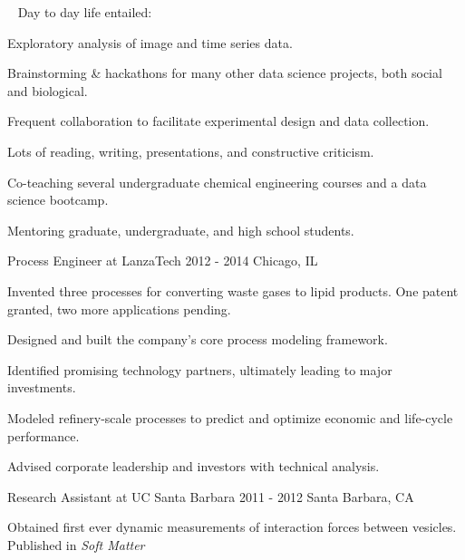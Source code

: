 \begin{cventries}
{%
    \ \newline 
    Day to day life entailed:
    \vspace{4.0mm}
    \begin{cvitems}
		 \item {Exploratory analysis of image and time series data.}
		 \item {Brainstorming \& hackathons for many other data science projects, both social and biological.}
		 \item {Frequent collaboration to facilitate experimental design and data collection.}
		 \item {Lots of reading, writing, presentations, and constructive criticism.}          
         \item {Co-teaching several undergraduate chemical engineering courses and a data science bootcamp.}
         \item {Mentoring graduate, undergraduate, and high school students.}         
      \end{cvitems}
     }
      
  \cventrynew
    {Process Engineer at LanzaTech} 
    {2012 - 2014} 
    {Chicago, IL} 
    {
      \begin{cvitems} %
        \item {Invented three processes for converting waste gases to lipid products. One patent granted, two more applications pending.}
		\item {Designed and built the company's core process modeling framework.}        
		\item {Identified promising technology partners, ultimately leading to major investments.}
        \item {Modeled refinery-scale processes to predict and optimize economic and life-cycle performance.}        
        \item {Advised corporate leadership and investors with technical analysis.}
      \end{cvitems}
    }
    
  \cventryshort
    {Research Assistant at UC Santa Barbara}
    {2011 - 2012}
    {Santa Barbara, CA}         
    {
      \begin{cvitems} %
        \item {Obtained first ever dynamic measurements of interaction forces between vesicles. Published in \emph{Soft Matter}}        
      \end{cvitems}
    }   
  

\end{cventries}
